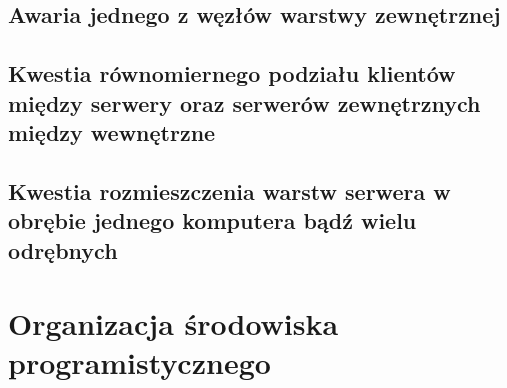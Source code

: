 \subsection*[Awaria węzła warstwy zewnętrznej]{Awaria jednego z węzłów warstwy zewnętrznej}

\subsection*[Kwestia równomiernego podziału klientów między serwery oraz serwerów zewnętrznych między wewnętrzne]{Kwestia równomiernego podziału klientów między serwery oraz serwerów zewnętrznych między wewnętrzne}

\subsection*[Kwestia rozmieszczenia warstw serwera w obrębie jednego komputera bądź wielu odrębnych]{Kwestia rozmieszczenia warstw serwera w obrębie jednego komputera bądź wielu odrębnych}


\section[Organizacja środowiska programistycznego]{Organizacja środowiska programistycznego}